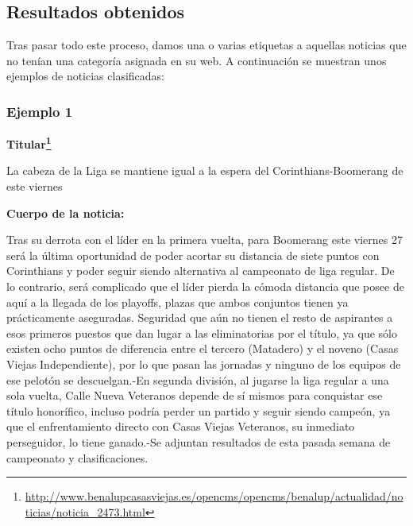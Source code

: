 \subsection{Resultados obtenidos}

Tras pasar todo este proceso, damos una o varias etiquetas a aquellas noticias que no tenían una categoría asignada en su web. A continuación se muestran unos ejemplos de noticias clasificadas:

\subsubsection*{Ejemplo 1}

\textbf{Titular\footnote{\url{http://www.benalupcasasviejas.es/opencms/opencms/benalup/actualidad/noticias/noticia_2473.html}}}

La cabeza de la Liga se mantiene igual a la espera del Corinthians-Boomerang de este viernes

\textbf{Cuerpo de la noticia:}

Tras su derrota con el líder en la primera vuelta, para Boomerang este viernes 27 será la última oportunidad de poder acortar su distancia de siete puntos con Corinthians y poder seguir siendo alternativa al campeonato de liga regular. De lo  contrario, será complicado que el líder pierda la cómoda distancia que posee de aquí a la llegada de los playoffs, plazas que ambos conjuntos tienen ya prácticamente aseguradas. Seguridad que aún no tienen el resto de aspirantes a esos primeros  puestos que dan lugar a las eliminatorias por el título, ya que sólo existen ocho puntos de diferencia entre el tercero (Matadero) y el noveno (Casas Viejas Independiente), por lo que pasan las jornadas y ninguno de los equipos de ese pelotón se descuelgan.-En segunda división, al jugarse la liga regular a una sola vuelta, Calle Nueva Veteranos depende de sí mismos para conquistar ese título honorífico, incluso podría  perder un partido y seguir siendo campeón, ya que el enfrentamiento directo con Casas Viejas Veteranos, su inmediato perseguidor, lo tiene ganado.-Se adjuntan resultados de esta pasada semana de campeonato y clasificaciones.


